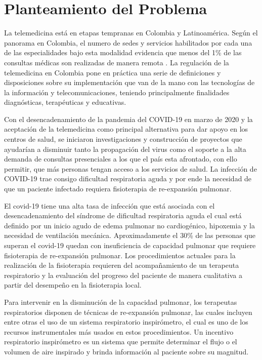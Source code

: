 
\section{Planteamiento del Problema}

La telemedicina est\'a en etapas tempranas en Colombia y Latinoam\'erica. Seg\'un el panorama en Colombia, el numero de sedes y servicios habilitados por cada una de las especialidades bajo esta modalidad evidencia que menos del 1\% de las consultas m\'edicas son realizadas de manera remota \cite{39}. La regulaci\'on de la telemedicina en Colombia pone en pr\'actica  una serie de definiciones y disposiciones sobre su implementaci\'on que van de la mano con las tecnolog\'ias de la informaci\'on y telecomunicaciones, teniendo principalmente finalidades diagn\'osticas, terap\'euticas y educativas\cite{40}.

Con el desencadenamiento de la pandemia del COVID-19 en marzo de 2020 y la aceptaci\'on de la telemedicina como principal alternativa para dar apoyo en los centros de salud, se iniciaron investigaciones y construcci\'on de proyectos que ayudar\'ian a disminuir tanto la propagaci\'on del virus como el soporte a la alta demanda de consultas presenciales a los que el pa\'is esta afrontado, con ello permitir, que m\'as personas tengan acceso a los servicios de salud. La infecci\'on de COVID-19 trae consigo dificultad respiratoria aguda y por ende la necesidad de que un paciente infectado requiera fisioterapia de re-expansi\'on pulmonar. %

El covid-19 tiene una alta tasa de infecci\'on que est\'a asociada con el desencadenamiento del s\'indrome de dificultad respiratoria aguda el cual est\'a definido por un inicio agudo de edema pulmonar no cardiog\'enico, hipoxemia y la necesidad de ventilaci\'on mec\'anica\cite{41}. Aproximadamente el 30\% de las personas que superan el covid-19 quedan con insuficiencia de capacidad pulmonar que requiere fisioterapia de re-expansi\'on pulmonar\cite{42}.  Los procedimientos actuales para la realizaci\'on de la fisioterapia requieren del acompa\~{n}amiento de un terapeuta respiratorio y la evaluaci\'on del progreso del paciente de manera cualitativa a partir del desempe\~{n}o en la fisioterapia local. 

Para intervenir en la disminuci\'on de la capacidad pulmonar, los terapeutas respiratorios disponen de t\'ecnicas de re-expansi\'on pulmonar, las cuales incluyen entre otras el uso de un sistema respiratorio inspir\'ometro, el cual es uno de los recursos instrumentales m\'as usados en estos procedimientos. Un incentivo respiratorio inspir\'ometro  es un sistema que permite determinar el flujo o el volumen de aire inspirado y brinda informaci\'on al paciente sobre su magnitud. \cite{43}\cite{44} 

